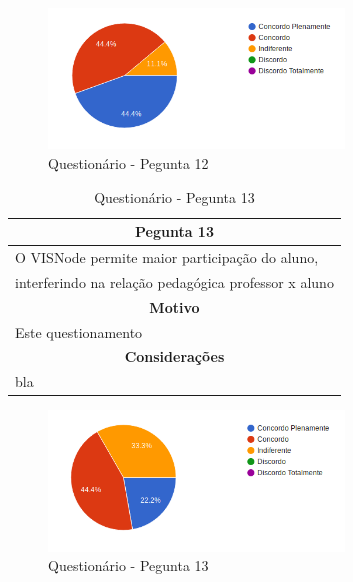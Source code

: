 \documentclass[
	12pt,				%
	oneside,			%
	a4paper,			%
	english,			%
	french,				%
	spanish,			%
	brazil,				%
	]{abntex2}
\begin{document}
\begin{figure}[H]
\centering
\caption{Questionário - Pegunta 12}
\includegraphics[width=0.7\textwidth]{imagens/v1/p12.png}
\sourceAuthor
\end{figure}

\begin{table}[H]
\centering
\caption{Questionário - Pegunta 13} 
\def\arraystretch{1.5}
\begin{tabular}{l}
\hline
\multicolumn{1}{c}{\textbf{Pegunta 13}}              \\ \hline
O VISNode permite maior participação do aluno, \\ interferindo na relação pedagógica professor x aluno \\ \hline
\multicolumn{1}{c}{\textbf{Motivo}}                 \\ \hline
Este questionamento                                   \\ \hline
\multicolumn{1}{c}{\textbf{Considerações}}          \\ \hline
bla                                                   \\ \hline
\end{tabular}
\sourceAuthor
\end{table}

\begin{figure}[H]
\centering
\caption{Questionário - Pegunta 13}
\includegraphics[width=0.7\textwidth]{imagens/v1/p13.png}
\sourceAuthor
\end{figure}
\end{document}
